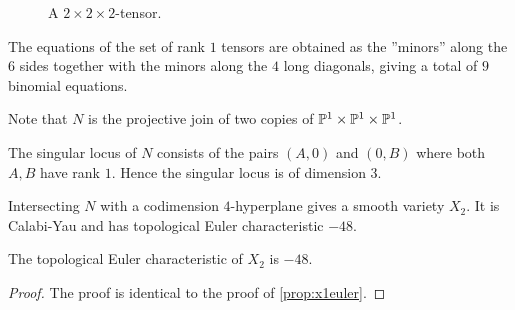 \begin{figure}
\centering
{}
\caption{A $2 \times 2 \times 2$-tensor.}
\label{fig:222tensor}
\end{figure}

The equations of the set of rank $1$ tensors are obtained as the ''minors'' along the $6$ sides together with the minors along the $4$ long diagonals, giving a total of $9$ binomial equations. 

Note that $N$ is the projective join of two copies of $\P^1 \times \P^1 \times \P^1$.

The singular locus of $N$ consists of the pairs $(A,0)$ and $(0,B)$ where both $A,B$ have rank $1$. Hence the singular locus is of dimension $3$.

Intersecting $N$ with a codimension $4$-hyperplane gives a smooth variety $X_2$. It is Calabi-Yau and has topological Euler characteristic $-48$.

\begin{proposition}
The topological Euler characteristic of $X_2$ is $-48$.
\end{proposition}
\begin{proof}
The proof is identical to the proof of \cref{prop:x1euler}.
\end{proof}
